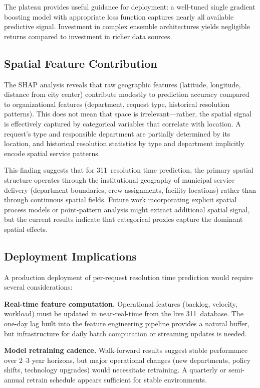 \documentclass[sigconf,nonacm]{acmart}
\begin{document}
The plateau provides useful guidance for deployment: a well-tuned
single gradient boosting model with appropriate loss function
captures nearly all available predictive signal. Investment in
complex ensemble architectures yields negligible returns compared
to investment in richer data sources.

\subsection{Spatial Feature Contribution}

The SHAP analysis reveals that raw geographic features
(latitude, longitude, distance from city center) contribute
modestly to prediction accuracy compared to organizational
features (department, request type, historical resolution
patterns). This does not mean that space is irrelevant---rather,
the spatial signal is effectively captured by categorical
variables that correlate with location. A request's type and
responsible department are partially determined by its location,
and historical resolution statistics by type and department
implicitly encode spatial service patterns.

This finding suggests that for 311~resolution time prediction,
the primary spatial structure operates through the institutional
geography of municipal service delivery (department boundaries,
crew assignments, facility locations) rather than through
continuous spatial fields. Future work incorporating explicit
spatial process models or point-pattern analysis might extract
additional spatial signal, but the current results indicate that
categorical proxies capture the dominant spatial effects.

\subsection{Deployment Implications}

A production deployment of per-request resolution time
prediction would require several considerations:

\textbf{Real-time feature computation.} Operational features
(backlog, velocity, workload) must be updated in near-real-time
from the live 311~database. The one-day lag built into the
feature engineering pipeline provides a natural buffer, but
infrastructure for daily batch computation or streaming updates is
needed.

\textbf{Model retraining cadence.} Walk-forward results suggest
stable performance over 2--3 year horizons, but major operational
changes (new departments, policy shifts, technology upgrades)
would necessitate retraining. A quarterly or semi-annual retrain
schedule appears sufficient for stable environments.
\end{document}
